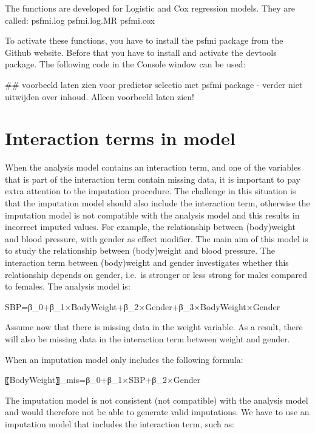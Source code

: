 \documentclass[]{book}
\newenvironment{Shaded}{\begin{snugshade}}{\end{snugshade}}
\newcommand{\NormalTok}[1]{#1}
\begin{document}
The functions are developed for Logistic and Cox regression models. They
are called: psfmi.log psfmi.log.MR psfmi.cox

To activate these functions, you have to install the psfmi package from
the Github website. Before that you have to install and activate the
devtools package. The following code in the Console window can be used:

\begin{Shaded}
\begin{Highlighting}[]
\NormalTok{## voorbeeld laten zien voor predictor selectio met psfmi package - verder niet uitwijden over inhoud. Alleen voorbeeld laten zien!}
\end{Highlighting}
\end{Shaded}

\section{Interaction terms in model}\label{interaction-terms-in-model}

When the analysis model contains an interaction term, and one of the
variables that is part of the interaction term contain missing data, it
is important to pay extra attention to the imputation procedure. The
challenge in this situation is that the imputation model should also
include the interaction term, otherwise the imputation model is not
compatible with the analysis model and this results in incorrect imputed
values. For example, the relationship between (body)weight and blood
pressure, with gender as effect modifier. The main aim of this model is
to study the relationship between (body)weight and blood pressure. The
interaction term between (body)weight and gender investigates whether
this relationship depends on gender, i.e.~is stronger or less strong for
males compared to females. The analysis model is:

SBP=β\_0+β\_1×BodyWeight+β\_2×Gender+β\_3×BodyWeight×Gender

Assume now that there is missing data in the weight variable. As a
result, there will also be missing data in the interaction term between
weight and gender.

When an imputation model only includes the following formula:

〖BodyWeight〗\_mis=β\_0+β\_1×SBP+β\_2×Gender

The imputation model is not consistent (not compatible) with the
analysis model and would therefore not be able to generate valid
imputations. We have to use an imputation model that includes the
interaction term, such as:
\end{document}
